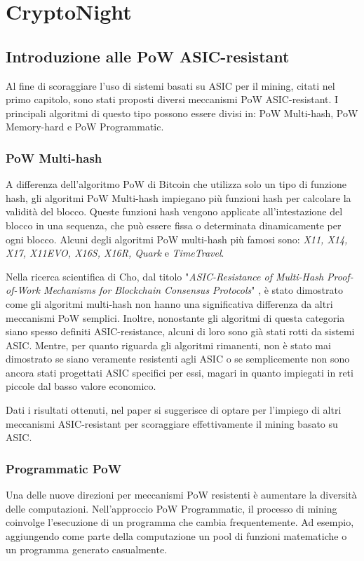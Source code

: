 \chapter{CryptoNight}
\section{Introduzione alle PoW ASIC-resistant}
Al fine di scoraggiare l'uso di sistemi basati su ASIC per il mining, citati nel primo capitolo, sono stati proposti diversi meccanismi PoW ASIC-resistant.
I principali algoritmi di questo tipo possono essere divisi in: PoW Multi-hash, PoW Memory-hard e PoW Programmatic.

\subsection{PoW Multi-hash}
A differenza dell'algoritmo PoW di Bitcoin che utilizza solo un tipo di funzione hash, gli algoritmi PoW Multi-hash impiegano più funzioni hash per calcolare la validità del blocco. Queste funzioni hash vengono applicate all'intestazione del blocco in una sequenza, che può essere fissa o determinata dinamicamente per ogni blocco. 
Alcuni degli algoritmi PoW multi-hash più famosi sono: \textit{X11, X14, X17, X11EVO, X16S, X16R, Quark} e \textit{TimeTravel}.

Nella ricerca scientifica di Cho, dal titolo "\textit{ASIC-Resistance of Multi-Hash Proof-of-Work Mechanisms for Blockchain Consensus Protocols}" \cite{asic1}, è stato dimostrato come gli algoritmi multi-hash non hanno una significativa differenza da altri meccanismi PoW semplici.
Inoltre, nonostante gli algoritmi di questa categoria siano spesso definiti ASIC-resistance, alcuni di loro sono già stati rotti da sistemi ASIC.
Mentre, per quanto riguarda gli algoritmi rimanenti, non è stato mai dimostrato se siano veramente resistenti agli ASIC o se semplicemente non sono ancora stati progettati ASIC specifici per essi, magari in quanto impiegati in reti piccole dal basso valore economico.

Dati i risultati ottenuti, nel paper si suggerisce di optare per l'impiego di altri meccanismi ASIC-resistant per scoraggiare effettivamente il mining basato su ASIC.

\subsection{Programmatic PoW}
Una delle nuove direzioni per meccanismi PoW resistenti è aumentare la diversità delle computazioni. 
Nell'approccio PoW Programmatic, il processo di mining coinvolge l'esecuzione di un programma che cambia frequentemente. 
Ad esempio, aggiungendo come parte della computazione un pool di funzioni matematiche o un programma generato casualmente. 

